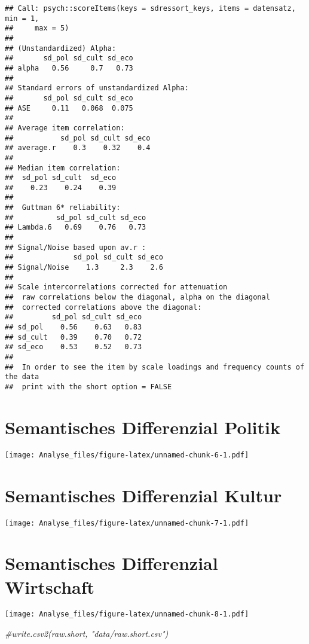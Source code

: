 \documentclass[]{article}
\newenvironment{Shaded}{\begin{snugshade}}{\end{snugshade}}
\newcommand{\CommentTok}[1]{\textcolor[rgb]{0.56,0.35,0.01}{\textit{#1}}}
\begin{document}
\begin{verbatim}
## Call: psych::scoreItems(keys = sdressort_keys, items = datensatz, min = 1, 
##     max = 5)
## 
## (Unstandardized) Alpha:
##       sd_pol sd_cult sd_eco
## alpha   0.56     0.7   0.73
## 
## Standard errors of unstandardized Alpha:
##       sd_pol sd_cult sd_eco
## ASE     0.11   0.068  0.075
## 
## Average item correlation:
##           sd_pol sd_cult sd_eco
## average.r    0.3    0.32    0.4
## 
## Median item correlation:
##  sd_pol sd_cult  sd_eco 
##    0.23    0.24    0.39 
## 
##  Guttman 6* reliability: 
##          sd_pol sd_cult sd_eco
## Lambda.6   0.69    0.76   0.73
## 
## Signal/Noise based upon av.r : 
##              sd_pol sd_cult sd_eco
## Signal/Noise    1.3     2.3    2.6
## 
## Scale intercorrelations corrected for attenuation 
##  raw correlations below the diagonal, alpha on the diagonal 
##  corrected correlations above the diagonal:
##         sd_pol sd_cult sd_eco
## sd_pol    0.56    0.63   0.83
## sd_cult   0.39    0.70   0.72
## sd_eco    0.53    0.52   0.73
## 
##  In order to see the item by scale loadings and frequency counts of the data
##  print with the short option = FALSE
\end{verbatim}

\section{Semantisches Differenzial
Politik}\label{semantisches-differenzial-politik}

\texttt{[image: Analyse\_files/figure-latex/unnamed-chunk-6-1.pdf]}

\section{Semantisches Differenzial
Kultur}\label{semantisches-differenzial-kultur}

\texttt{[image: Analyse\_files/figure-latex/unnamed-chunk-7-1.pdf]}

\section{Semantisches Differenzial
Wirtschaft}\label{semantisches-differenzial-wirtschaft}

\texttt{[image: Analyse\_files/figure-latex/unnamed-chunk-8-1.pdf]}

\begin{Shaded}
\begin{Highlighting}[]
\CommentTok{#write.csv2(raw.short, "data/raw.short.csv")}
\end{Highlighting}
\end{Shaded}
\end{document}
